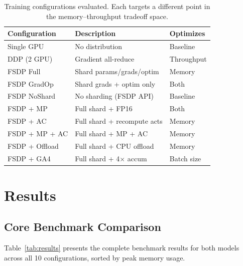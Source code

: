\documentclass[sigconf]{acmart}
\begin{document}
\begin{table}[h]
\caption{Training configurations evaluated. Each targets a different point in the memory--throughput tradeoff space.}
\label{tab:configs}
\small
\begin{tabular}{lll}
\toprule
\textbf{Configuration} & \textbf{Description} & \textbf{Optimizes} \\
\midrule
Single GPU & No distribution & Baseline \\
DDP (2 GPU) & Gradient all-reduce & Throughput \\
FSDP Full & Shard params/grads/optim & Memory \\
FSDP GradOp & Shard grads + optim only & Both \\
FSDP NoShard & No sharding (FSDP API) & Baseline \\
FSDP + MP & Full shard + FP16 & Both \\
FSDP + AC & Full shard + recompute acts & Memory \\
FSDP + MP + AC & Full shard + MP + AC & Memory \\
FSDP + Offload & Full shard + CPU offload & Memory \\
FSDP + GA4 & Full shard + 4$\times$ accum & Batch size \\
\bottomrule
\end{tabular}
\end{table}

\section{Results}

\subsection{Core Benchmark Comparison}

Table~\ref{tab:results} presents the complete benchmark results for both models across all 10 configurations, sorted by peak memory usage.
\end{document}
